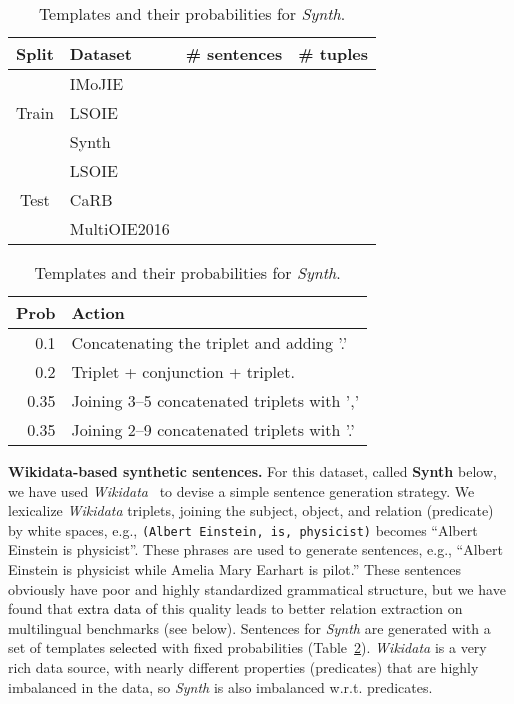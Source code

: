 \documentclass[letterpaper]{article} \usepackage{aaai22}  \usepackage{times}  \usepackage{helvet}  \usepackage{courier}  \usepackage[hyphens]{url}  \usepackage{graphicx} \usepackage{placeins}
\newcommand{\camera}[1]{\textcolor{black}{#1}}
\begin{document}
\begin{table}[!t]
\centering\small
\begin{tabular*}{\columnwidth}{cp{2.4cm}cc} 
\toprule
\textbf{Split}         & \textbf{Dataset} & \textbf{\# sentences} & \textbf{\# tuples} \\ \hline
\multirow{3}{*}{Train} & IMoJIE  &  &   \\ 
                       & LSOIE &  &   \\
                       & Synth &  &  \\
\hline
\multirow{4}{*}{Test}  & LSOIE &   &  \\                      
                       & CaRB   &  &  \\
                       & MultiOIE2016 &  &  \\
\bottomrule
\end{tabular*}

\caption{Dataset statistics; the MultiOIE2016 and Synth numbers are given for each language.}\label{tab:datasets}\vspace{.2cm}

    \begin{tabular}{r|l}\toprule
        \textbf{Prob} & \textbf{Action} \\ \hline
        0.1 & Concatenating the triplet and adding '.' \\
        0.2 & Triplet + conjunction + triplet. \\
        0.35 & Joining 3--5 concatenated triplets with ',' \\
        0.35 & Joining 2--9 concatenated triplets with '.'\\ \bottomrule
    \end{tabular}
    
    \caption{Templates and their probabilities for \emph{Synth}.}\label{tab:templates_wdt_synthetic}
\end{table}

\textbf{Wikidata-based synthetic sentences.} For this dataset, called \textbf{Synth} below,
we have used \emph{Wikidata}~\cite{vrandevcic2014wikidata} to devise a simple sentence generation strategy.
We lexicalize \emph{Wikidata} triplets, joining the subject, object, and relation (predicate) by white spaces, e.g., \texttt{(Albert Einstein, is, physicist)} becomes ``Albert Einstein is physicist''. These phrases are used to generate sentences, e.g., ``Albert Einstein is physicist while Amelia Mary Earhart is pilot.'' These sentences obviously have poor and highly standardized grammatical structure, but we have found that \camera{extra data of} this quality leads to better relation extraction on multilingual benchmarks (see below).
Sentences for \emph{Synth} are generated with a set of templates \camera{selected}
with fixed probabilities (Table~\ref{tab:templates_wdt_synthetic}).
\emph{Wikidata} is a very rich data source, with nearly  different properties (predicates) that are highly imbalanced in the data, so \emph{Synth} is also imbalanced w.r.t. predicates.
 
\end{document}

